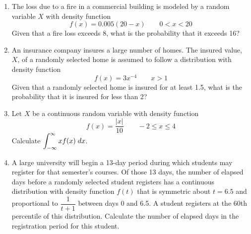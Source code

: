 \documentclass[../main.tex]{subfiles}
\begin{document}
\begin{exercises}
\begin{enumerate}
	\item %
	The loss due to a fire in a commercial building is modeled by a random
	variable $X$ with density function
	$$f(x) = 0.005(20-x) \qquad 0<x<20$$
	Given that a fire loss exceeds 8, what is the probability that
	it exceeds 16?
	
	\item %
	An insurance company insures a large number of homes. The insured value,
	$X$, of a randomly selected home is assumed to follow a distribution with
	density function
	$$f(x) = 3x^{-4} \qquad x>1$$
	Given that a randomly selected home is insured for at least
	1.5, what is the probability that it is insured for less than 
	2?
	
	\item %
	Let $X$ be a continuous random variable with density function
	$$f(x) = \dfrac{|x|}{10} \qquad -2 \leq x \leq 4$$
	Calculate $\displaystyle \int_{-\infty}^\infty xf(x)\;dx$.
	
	\item %
	A large university will begin a 13-day period during which students may register for that semester’s courses. Of those 13 days, the number of elapsed days
	before a randomly selected student registers has a continuous distribution
	with density function $f(t)$ that is symmetric about $t = 6.5$ and proportional
	to $\dfrac{1}{t+1}$
	between days 0 and 6.5.
	A student registers at the 60th percentile of this distribution. Calculate the
	number of elapsed days in the registration period for this student.
	
\end{enumerate}
\end{exercises}
\end{document}
